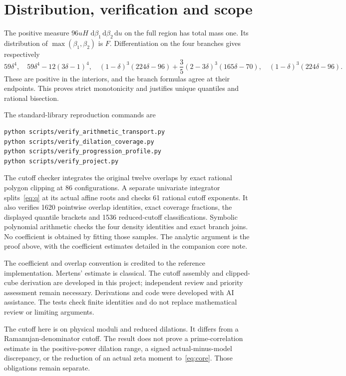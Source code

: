 \documentclass[11pt]{article}
\newcommand{\dd}{\,\mathrm d}
\begin{document}
\section{Distribution, verification and scope}
The positive measure $96uH\,\dd\beta_1\dd\beta_2\dd u$ on the full region
has total mass one. Its distribution of $\max(\beta_1,\beta_2)$ is $F$.
Differentiation on the four branches gives respectively
\[
 59\delta^4,\quad59\delta^4-12(3\delta-1)^4,\quad
 (1-\delta)^3(224\delta-96)
       +\frac35(2-3\delta)^3(165\delta-70),\quad
 (1-\delta)^3(224\delta-96).
\]
These are positive in the interiors, and the branch formulas agree
at their endpoints. This proves strict monotonicity and justifies
unique quantiles and rational bisection.

The standard-library reproduction commands are
\begin{verbatim}
python scripts/verify_arithmetic_transport.py
python scripts/verify_dilation_coverage.py
python scripts/verify_progression_profile.py
python scripts/verify_project.py
\end{verbatim}
The cutoff checker integrates the original twelve overlaps by exact
rational polygon clipping at 86 configurations. A separate univariate
integrator splits~\eqref{eq:q} at its actual affine roots and checks
61 rational cutoff exponents. It also verifies 1620 pointwise overlap
identities, exact coverage fractions, the displayed quantile brackets
and 1536 reduced-cutoff classifications. Symbolic polynomial arithmetic
checks the four density identities and exact branch joins. No coefficient is obtained by
fitting those samples. The analytic argument is the proof above,
with the coefficient estimates detailed in the companion core note.

The coefficient and overlap convention is credited to the reference
implementation. Mertens' estimate is classical. The cutoff assembly
and clipped-cube derivation are developed in this project; independent
review and priority assessment remain necessary. Derivations and code
were developed with AI assistance. The tests check finite identities
and do not replace mathematical review or limiting arguments.

The cutoff here is on physical moduli and reduced dilations. It differs
from a Ramanujan-denominator cutoff. The result does not prove a
prime-correlation estimate in the positive-power dilation range,
a signed actual-minus-model discrepancy, or the reduction of an
actual zeta moment to~\eqref{eq:core}. Those obligations remain separate.
\end{document}
